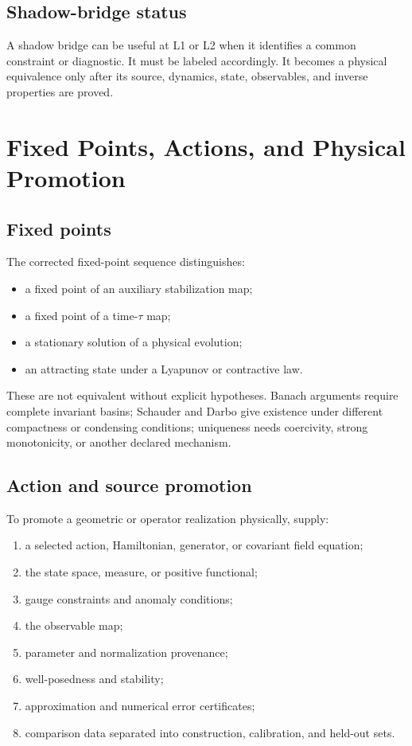 \documentclass[11pt]{article}
\begin{document}
\subsection{Shadow-bridge status}

A shadow bridge can be useful at L1 or L2 when it identifies a common
constraint or diagnostic.  It must be labeled accordingly.  It becomes a
physical equivalence only after its source, dynamics, state, observables, and
inverse properties are proved.

\section{Fixed Points, Actions, and Physical Promotion}

\subsection{Fixed points}

The corrected fixed-point sequence distinguishes:
\begin{itemize}
\item a fixed point of an auxiliary stabilization map;
\item a fixed point of a time-$\tau$ map;
\item a stationary solution of a physical evolution;
\item an attracting state under a Lyapunov or contractive law.
\end{itemize}
These are not equivalent without explicit hypotheses.  Banach arguments
require complete invariant basins; Schauder and Darbo give existence under
different compactness or condensing conditions; uniqueness needs coercivity,
strong monotonicity, or another declared mechanism.

\subsection{Action and source promotion}

To promote a geometric or operator realization physically, supply:
\begin{enumerate}[label=\textbf{P\arabic*.}]
\item a selected action, Hamiltonian, generator, or covariant field equation;
\item the state space, measure, or positive functional;
\item gauge constraints and anomaly conditions;
\item the observable map;
\item parameter and normalization provenance;
\item well-posedness and stability;
\item approximation and numerical error certificates;
\item comparison data separated into construction, calibration, and held-out
sets.
\end{enumerate}
\end{document}
